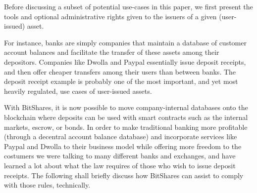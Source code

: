 \label{sec:uia:restrictions}

Before discussing a subset of potential use-cases in this paper, we first
present the tools and optional administrative rights given to the issuers of a
given (user-issued) asset.

For instance, banks are simply companies that maintain a database of customer
account balances and facilitate the transfer of these assets among their
depositors. Companies like Dwolla and Paypal essentially issue deposit
receipts, and then offer cheaper transfers among their users than between
banks. The deposit receipt example is probably one of the most important, and
yet most heavily regulated, use cases of user-issued assets.

With BitShares, it is now possible to move company-internal databases onto the
blockchain where deposits can be used with smart contracts such as the internal
markets, escrow, or bonds. In order to make traditional banking more profitable
(through a decentral account balance database) and incorporate services like
Paypal and Dwolla to their business model while offering more freedom to the
costumers we were talking to many different banks and exchanges, and have
learned a lot about what the law requires of those who wish to issue deposit
receipts. The following shall briefly discuss how BitShares can assist to
comply with those rules, technically.
